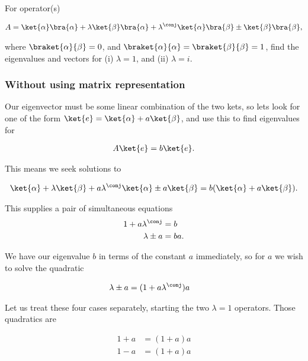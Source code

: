 For operator(s)

\begin{align}\label{eqn:desaiDiracNotes:60}
A = 
\ket{\alpha}\bra{\alpha}
+ \lambda \ket{\beta}\bra{\alpha}
+ \lambda^\conj \ket{\alpha}\bra{\beta}
\pm \ket{\beta}\bra{\beta},
\end{align}

where $\braket{\alpha}{\beta} = 0$, and $\braket{\alpha}{\alpha} = \braket{\beta}{\beta} = 1$, find the eigenvalues and vectors for (i) $\lambda = 1$, and (ii) $\lambda = i$.

\subsubsection{Without using matrix representation}
Our eigenvector must be some linear combination of the two kets, so lets look for one of the form $\ket{e} = \ket{\alpha} + a\ket{\beta}$, and use this to find eigenvalues for

\begin{align}\label{eqn:desaiDiracNotes:61}
A \ket{e} = b \ket{e}.
\end{align}

This means we seek solutions to

\begin{align}\label{eqn:desaiDiracNotes:62}
\ket{\alpha}
+ \lambda \ket{\beta}
+ a \lambda^\conj \ket{\alpha}
\pm a \ket{\beta}
= b ( \ket{\alpha} + a \ket{\beta} ).
\end{align}

This supplies a pair of simultaneous equations
\begin{align}\label{eqn:desaiDiracNotes:63}
1 + a \lambda^\conj &= b \\
\lambda \pm a &= b a.
\end{align}

We have our eigenvalue $b$ in terms of the constant $a$ immediately, so for $a$ we wish to solve the quadratic

\begin{align}\label{eqn:desaiDiracNotes:64}
\lambda \pm a &= (1 + a \lambda^\conj ) a
\end{align}

Let us treat these four cases separately, starting the two $\lambda = 1$ operators.  Those quadratics are

\begin{align}\label{eqn:desaiDiracNotes:65}
1 + a &= (1 + a ) a \\
1 - a &= (1 + a ) a
\end{align}

